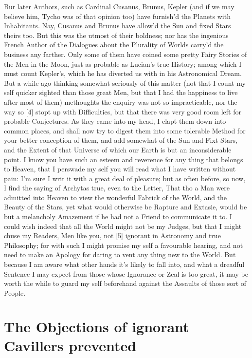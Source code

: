 \documentclass[letterpaper]{book}
\begin{document}
Bur later Authors, such as Cardinal Cusanus, Brunus, Kepler (and if we may
believe him, Tycho was of that opinion too) have furnish'd the Planets with
Inhabitants. Nay, Cusanus and Brunus have allow'd the Sun and fixed Stars
theirs too. But this was the utmost of their boldness; nor has the ingenious
French Author of the Dialogues about the Plurality of Worlds carry'd the
business any farther. Only some of them have coined some pretty Fairy
Stories of the Men in the Moon, just as probable as Lucian's true History;
among which I must count Kepler's, which he has diverted us with in his
Astronomical Dream. But a while ago thinking somewhat seriously of this
matter (not that I count my self quicker sighted than those great Men, but
that I had the happiness to live after most of them) methoughts the enquiry
was not so impracticable, nor the way so [4] stopt up with Difficulties, but
that there was very good room left for probable Conjectures. As they came
into my head, I clapt them down into common places, and shall now try to
digest them into some tolerable Method for your better conception of them,
and add somewhat of the Sun and Fixt Stars, and the Extent of that Universe
of which our Earth is but an inconsiderable point. I know you have such an
esteem and reverence for any thing that belongs to Heaven, that I perswade
my self you will read what I have written without pain: I'm sure I writ it
with a great deal of pleasure; but as often before, so now, I find the
saying of Archytas true, even to the Letter, That tho a Man were admitted
into Heaven to view the wonderful Fabrick of the World, and the Beauty of
the Stars, yet what would otherwise be Rapture and Extasie, would be but a
melancholy Amazement if he had not a Friend to communicate it to. I could
wish indeed that all the World might not be my Judges, but that I might
chuse my Readers, Men like you, not [5] ignorant in Astronomy and true
Philosophy; for with such I might promise my self a favourable hearing, and
not need to make an Apology for daring to vent any thing new to the World.
But because I am aware what other hands it's likely to fall into, and what a
dreadful Sentence I may expect from those whose Ignorance or Zeal is too
great, it may be worth the while to guard my self beforehand against the
Assaults of those sort of People.


\section{The Objections of ignorant Cavillers prevented}
\end{document}
